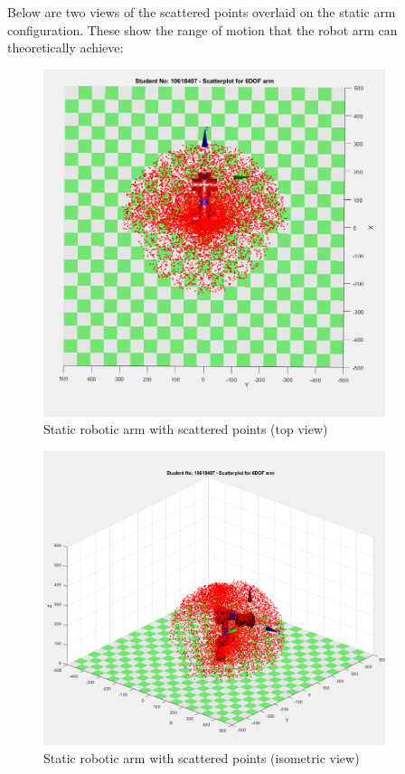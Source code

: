\documentclass [11pt]{report}
\begin{document}
Below are two views of the scattered points overlaid on the static arm configuration. These show the range of motion that the robot arm can theoretically achieve:


\begin{figure}[H]
\centerline{\includegraphics[width=10cm]{StaticRoboticArmwithScatteredPointsTopView.png}}
\caption{Static robotic arm with scattered points (top view)}
\label{fig}
\end{figure}

\begin{figure}[H]
\centerline{\includegraphics[width=10cm]{StaticRoboticArmwithScatteredPointsIsometricView.png}}
\caption{Static robotic arm with scattered points (isometric view)}
\label{fig}
\end{figure}  
\end{document}
